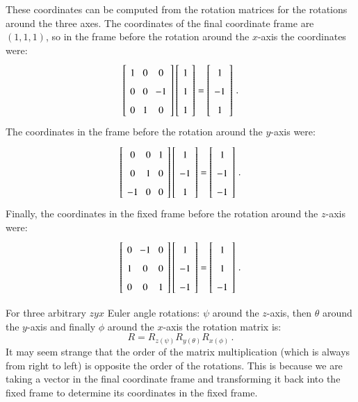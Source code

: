 These coordinates can be computed from the rotation matrices for the rotations around the three axes. The coordinates of the final coordinate frame are $(1,1,1)$, so in the frame before the rotation around the $x$-axis the coordinates were:
\[
\spacearray
\left[\begin{array}{ccc}1&0&0\\0&0&-1\\0&1&0\\\end{array}\right]
\left[\begin{array}{c}1\\1\\1\end{array}\right]=
\left[\begin{array}{c}1\\-1\\1\end{array}\right]\,.
\]
The coordinates in the frame before the rotation around the $y$-axis were:
\[
\spacearray
\left[\begin{array}{ccc}0&0&1\\0&1&0\\-1&0&0\\\end{array}\right]
\left[\begin{array}{c}1\\-1\\1\end{array}\right]=
\left[\begin{array}{c}1\\-1\\-1\end{array}\right]\,.
\]
Finally, the coordinates in the fixed frame before the rotation around the $z$-axis were:
\[
\spacearray
\left[\begin{array}{ccc}0&-1&0\\1&0&0\\0&0&1\\\end{array}\right]
\left[\begin{array}{c}1\\-1\\-1\end{array}\right]=
\left[\begin{array}{c}1\\1\\-1\end{array}\right]\,.
\]

For three arbitrary $zyx$ Euler angle rotations: $\psi$ around the $z$-axis, then $\theta$ around the $y$-axis and finally $\phi$ around the $x$-axis the rotation matrix is:
\[
R=R_{z(\psi)}R_{y(\theta)}R_{x(\phi)}\,.
\]
It may seem strange that the order of the matrix multiplication (which is always from right to left) is opposite the order of the rotations. This is because we are taking a vector in the final coordinate frame and transforming it back into the fixed frame to determine its coordinates in the fixed frame.

